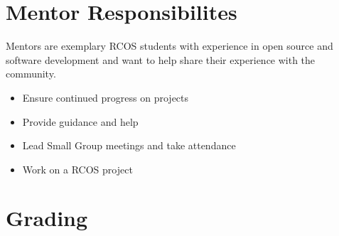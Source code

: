 \documentclass[12pt]{article}
\begin{document}
    \section{Mentor Responsibilites}

    Mentors are exemplary RCOS students with experience in open source and software development and want to help share their experience with the community.

    \begin{itemize}
        \item Ensure continued progress on projects
        \item Provide guidance and help
        \item Lead Small Group meetings and take attendance
        \item Work on a RCOS project
    \end{itemize}

    \section{Grading}

\end{document}
